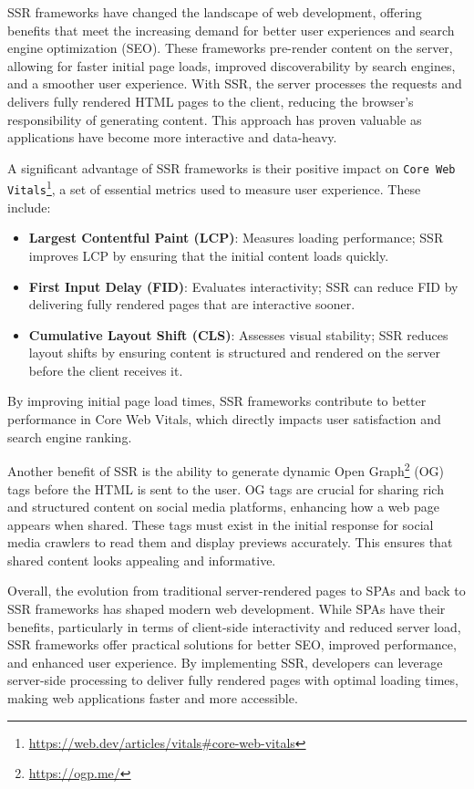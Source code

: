 SSR frameworks have changed the landscape of web development, offering benefits that meet the increasing demand for better user experiences and search engine optimization (SEO). These frameworks pre-render content on the server, allowing for faster initial page loads, improved discoverability by search engines, and a smoother user experience. With SSR, the server processes the requests and delivers fully rendered HTML pages to the client, reducing the browser’s responsibility of generating content. This approach has proven valuable as applications have become more interactive and data-heavy.

A significant advantage of SSR frameworks is their positive impact on \texttt{Core Web Vitals}\footnote{\url{https://web.dev/articles/vitals\#core-web-vitals}}, a set of essential metrics used to measure user experience. These include:

\begin{itemize}
	\item \textbf{Largest Contentful Paint (LCP)}: Measures loading performance; SSR improves LCP by ensuring that the initial content loads quickly.
	\item \textbf{First Input Delay (FID)}: Evaluates interactivity; SSR can reduce FID by delivering fully rendered pages that are interactive sooner.
	\item \textbf{Cumulative Layout Shift (CLS)}: Assesses visual stability; SSR reduces layout shifts by ensuring content is structured and rendered on the server before the client receives it.
\end{itemize}

By improving initial page load times, SSR frameworks contribute to better performance in Core Web Vitals, which directly impacts user satisfaction and search engine ranking.

Another benefit of SSR is the ability to generate dynamic Open Graph\footnote{\url{https://ogp.me/}} (OG) tags before the HTML is sent to the user. OG tags are crucial for sharing rich and structured content on social media platforms, enhancing how a web page appears when shared. These tags must exist in the initial response for social media crawlers to read them and display previews accurately. This ensures that shared content looks appealing and informative.

Overall, the evolution from traditional server-rendered pages to SPAs and back to SSR frameworks has shaped modern web development. While SPAs have their benefits, particularly in terms of client-side interactivity and reduced server load, SSR frameworks offer practical solutions for better SEO, improved performance, and enhanced user experience. By implementing SSR, developers can leverage server-side processing to deliver fully rendered pages with optimal loading times, making web applications faster and more accessible.

